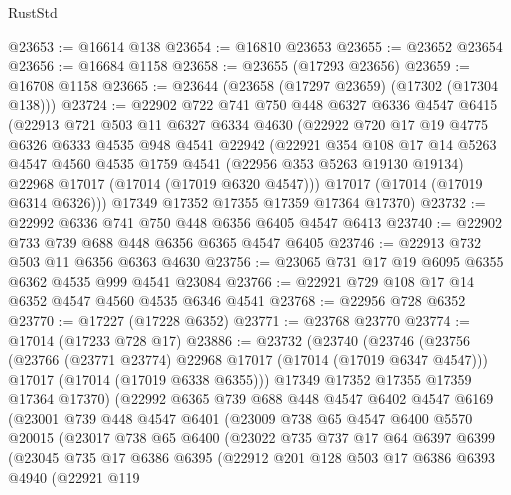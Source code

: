 \begin{lexlean}{RustStd}
\begin{coremodule}
@23653 := @16614 @138
@23654 := @16810 @23653
@23655 := @23652 @23654
@23656 := @16684 @1158
@23658 := @23655 (@17293 @23656)
@23659 := @16708 @1158
@23665 := @23644 (@23658 (@17297 @23659) (@17302 (@17304 @138)))
@23724 := @22902
    @722
    @741
    @750
    @448
    @6327
    @6336
    @4547
    @6415
    (@22913
      @721
      @503
      @11
      @6327
      @6334
      @4630
      (@22922
        @720
        @17
        @19
        @4775
        @6326
        @6333
        @4535
        @948
        @4541
        @22942
        (@22921
          @354
          @108
          @17
          @14
          @5263
          @4547
          @4560
          @4535
          @1759
          @4541
          (@22956 @353 @5263 @19130 @19134)
          @22968
          @17017
          (@17014 (@17019 @6320 @4547)))
        @17017
        (@17014 (@17019 @6314 @6326)))
      @17349
      @17352
      @17355
      @17359
      @17364
      @17370)
@23732 := @22992 @6336 @741 @750 @448 @6356 @6405 @4547 @6413
@23740 := @22902 @733 @739 @688 @448 @6356 @6365 @4547 @6405
@23746 := @22913 @732 @503 @11 @6356 @6363 @4630
@23756 := @23065 @731 @17 @19 @6095 @6355 @6362 @4535 @999 @4541 @23084
@23766 := @22921 @729 @108 @17 @14 @6352 @4547 @4560 @4535 @6346 @4541
@23768 := @22956 @728 @6352
@23770 := @17227 (@17228 @6352)
@23771 := @23768 @23770
@23774 := @17014 (@17233 @728 @17)
@23886 := @23732
    (@23740
      (@23746
        (@23756
          (@23766 (@23771 @23774) @22968 @17017 (@17014 (@17019 @6347 @4547)))
          @17017
          (@17014 (@17019 @6338 @6355)))
        @17349
        @17352
        @17355
        @17359
        @17364
        @17370)
      (@22992
        @6365
        @739
        @688
        @448
        @4547
        @6402
        @4547
        @6169
        (@23001
          @739
          @448
          @4547
          @6401
          (@23009
            @738
            @65
            @4547
            @6400
            @5570
            @20015
            (@23017
              @738
              @65
              @6400
              (@23022
                @735
                @737
                @17
                @64
                @6397
                @6399
                (@23045
                  @735
                  @17
                  @6386
                  @6395
                  (@22912
                    @201
                    @128
                    @503
                    @17
                    @6386
                    @6393
                    @4940
                    (@22921
                      @119

\end{coremodule}
\end{lexlean}
